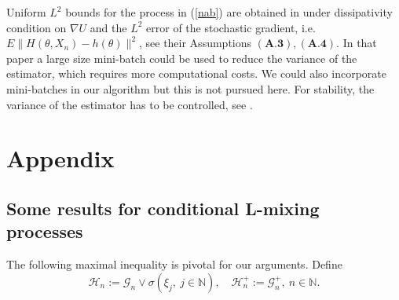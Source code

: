 \documentclass[a4paper]{article}
\begin{document}

Uniform $L^2$ bounds for the process in (\ref{nab}) are obtained in \cite{raginsky} under dissipativity condition on $\nabla U$ and the $L^2$ error of the stochastic gradient, i.e. $E\|H(\theta, X_n) - h(\theta)\|^2$, see their Assumptions $(\textbf{A.3}), (\textbf{A.4})$. In that paper a large size mini-batch could be used to reduce the variance of the estimator, which requires more computational costs. We could also incorporate mini-batches in our algorithm but this is not pursued here. For stability, the variance of the estimator has to be controlled, see \cite{teh}.

\section{Appendix}\label{sec_app}

\subsection{Some results for conditional L-mixing processes}\label{mixing_more}

The following maximal inequality is pivotal for our arguments.
Define $$
\mathcal{H}_n:=\mathcal{G}_n\vee\sigma(\xi_j,\ j\in\mathbb{N}),\quad
\mathcal{H}^+_n:=\mathcal{G}^+_n,\ n\in\mathbb{N}.
$$
\end{document}
